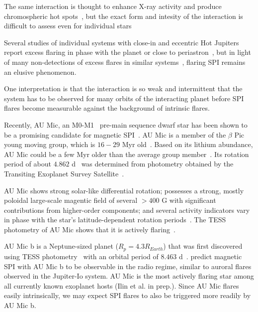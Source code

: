 \documentclass[fleqn,usenatbib,letters]{mnras}%
\begin{document}
The same interaction is thought to enhance X-ray activity and produce chromospheric hot spots~\citep{lanza2009}, but the exact form and intesity of the interaction is difficult to assess even for individual stars~\citep{strugarek2019}


Several studies of individual systems with close-in and eccentric Hot Jupiters report excess flaring in phase with the planet or close to periastron~\citep{shkolnik2005,pillitteri2011,maggio2015}, but in light of many non-detections of excess flares in similar systems~\citep{figueira2016, fischer2019}, flaring SPI remains an elusive phenomenon. 

One interpretation is that the interaction is so weak and intermittent that the system has to be observed for many orbits of the interacting planet before SPI flares become measurable against the background of intrinsic flares.

Recently, AU Mic, an M0-M1~\citep{pecaut2013,gaidos2014} pre-main sequence dwarf star has been shown to be a promising candidate for magnetic SPI~\citep{kavanagh2021}. AU Mic is a member of the $\beta$ Pic young moving group, which is $16-29$ Myr old~\citep{malo2014,binks2014,mamajek2014,bell2015,binks2016,shkolnik2017,miretroig2020}. Based on its lithium abundance, AU Mic could be a few Myr older than the average group member~\citep{malo2014}. 
Its rotation period of about $4.862$ d~\citep{plavchan2020, martioli2021} was determined from photometry obtained by the Transiting Exoplanet Survey Satellite~\citep[TESS,][]{ricker2014}.

AU Mic shows strong solar-like differential rotation; possesses a strong, mostly poloidal large-scale magentic field of several $>400$ G with significant contributions from higher-order components; and several activity indicators vary in phase with the star's latitude-dependent rotation periods~\citep{klein2021}. The TESS photometry of AU Mic shows that it is actively flaring~\citep{martioli2021}.

AU Mic b is a Neptune-sized planet ($R_p = 4.3R_{Earth}$) that was first discovered using TESS photometry~\citep{plavchan2020} with an orbital period of $8.463$ d~\citep{plavchan2020,martioli2021}. \citet{kavanagh2021} predict magnetic SPI with AU Mic b to be observable in the radio regime, similar to auroral flares observed in the Jupiter-Io system. AU Mic is the most actively flaring star among all currently known exoplanet hosts (Ilin et al. in prep.). Since AU Mic flares easily intrinsically, we may expect SPI flares to also be triggered more readily by AU Mic b. 
\end{document}
